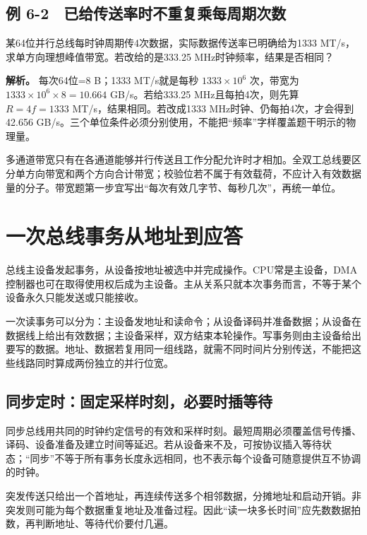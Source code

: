 \subsection{例 6-2　已给传送率时不重复乘每周期次数}\label{CO06-example-2}

\begin{example}[自拟数值例]

某64位并行总线每时钟周期传4次数据，实际数据传送率已明确给为1333 MT/s，求单方向理想峰值带宽。若改给的是333.25 MHz时钟频率，结果是否相同？

\end{example}

\textbf{解析。} 每次64位=8 B；1333 MT/s就是每秒 \(1333\times10^6\) 次，带宽为 \(1333\times10^6\times8=10.664\) GB/s。若给333.25 MHz且每拍4次，则先算 \(R=4f=1333\) MT/s，结果相同。若改成1333 MHz时钟、仍每拍4次，才会得到42.656 GB/s。三个单位条件必须分别使用，不能把``频率''字样覆盖题干明示的物理量。

多通道带宽只有在各通道能够并行传送且工作分配允许时才相加。全双工总线要区分单方向带宽和两个方向合计带宽；校验位若不属于有效载荷，不应计入有效数据量的分子。带宽题第一步宜写出``每次有效几字节、每秒几次''，再统一单位。

\section{一次总线事务从地址到应答}\label{CO06-transaction}

总线主设备发起事务，从设备按地址被选中并完成操作。CPU常是主设备，DMA控制器也可在取得使用权后成为主设备。主从关系只就本次事务而言，不等于某个设备永久只能发送或只能接收。

一次读事务可以分为：主设备发地址和读命令；从设备译码并准备数据；从设备在数据线上给出有效数据；主设备采样，双方结束本轮操作。写事务则由主设备给出要写的数据。地址、数据若复用同一组线路，就需不同时间片分别传送，不能把这些线路同时算成两份独立的并行位宽。

\subsection{同步定时：固定采样时刻，必要时插等待}\label{CO06-sync}

同步总线用共同的时钟约定信号的有效和采样时刻。最短周期必须覆盖信号传播、译码、设备准备及建立时间等延迟。若从设备来不及，可按协议插入等待状态；``同步''不等于所有事务长度永远相同，也不表示每个设备可随意提供互不协调的时钟。

突发传送只给出一个首地址，再连续传送多个相邻数据，分摊地址和启动开销。非突发则可能为每个数据重复地址及准备过程。因此``读一块多长时间''应先数数据拍数，再判断地址、等待代价要付几遍。

